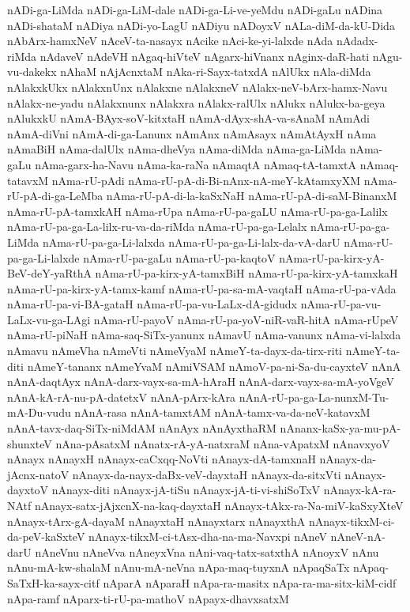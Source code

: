 {nADi-ga-LiMda
nADi-ga-LiM-dale
nADi-ga-Li-ve-yeMdu
nADi-gaLu
nADina
nADi-shataM
nADiya
nADi-yo-LagU
nADiyu
nADoyxV
nALa-diM-da-kU-Dida
nAbArx-hamxNeV
nAceV-ta-nasayx
nAcike
nAci-ke-yi-lalxde
nAda
nAdadx-riMda
nAdaveV
nAdeVH
nAgaq-hiVteV
nAgarx-hiVnanx
nAginx-daR-hati
nAgu-vu-dakekx
nAhaM
nAjAcnxtaM
nAka-ri-Sayx-tatxdA
nAlUkx
nAla-diMda
nAlakxkUkx
nAlakxnUnx
nAlakxne
nAlakxneV
nAlakx-neV-bArx-hamx-Navu
nAlakx-ne-yadu
nAlakxnunx
nAlakxra
nAlakx-ralUlx
nAlukx
nAlukx-ba-geya
nAlukxkU
nAmA-BAyx-soV-kitxtaH
nAmA-dAyx-shA-va-sAnaM
nAmAdi
nAmA-diVni
nAmA-di-ga-Lanunx
nAmAnx
nAmAsayx
nAmAtAyxH
nAma
nAmaBiH
nAma-dalUlx
nAma-dheVya
nAma-diMda
nAma-ga-LiMda
nAma-gaLu
nAma-garx-ha-Navu
nAma-ka-raNa
nAmaqtA
nAmaq-tA-tamxtA
nAmaq-tatavxM
nAma-rU-pAdi
nAma-rU-pA-di-Bi-nAnx-nA-meY-kAtamxyXM
nAma-rU-pA-di-ga-LeMba
nAma-rU-pA-di-la-kaSxNaH
nAma-rU-pA-di-saM-BinanxM
nAma-rU-pA-tamxkAH
nAma-rUpa
nAma-rU-pa-gaLU
nAma-rU-pa-ga-Lalilx
nAma-rU-pa-ga-La-lilx-ru-va-da-riMda
nAma-rU-pa-ga-Lelalx
nAma-rU-pa-ga-LiMda
nAma-rU-pa-ga-Li-lalxda
nAma-rU-pa-ga-Li-lalx-da-vA-darU
nAma-rU-pa-ga-Li-lalxde
nAma-rU-pa-gaLu
nAma-rU-pa-kaqtoV
nAma-rU-pa-kirx-yA-BeV-deY-yaRthA
nAma-rU-pa-kirx-yA-tamxBiH
nAma-rU-pa-kirx-yA-tamxkaH
nAma-rU-pa-kirx-yA-tamx-kamf
nAma-rU-pa-sa-mA-vaqtaH
nAma-rU-pa-vAda
nAma-rU-pa-vi-BA-gataH
nAma-rU-pa-vu-LaLx-dA-gidudx
nAma-rU-pa-vu-LaLx-vu-ga-LAgi
nAma-rU-payoV
nAma-rU-pa-yoV-niR-vaR-hitA
nAma-rUpeV
nAma-rU-piNaH
nAma-saq-SiTx-yanunx
nAmavU
nAma-vanunx
nAma-vi-lalxda
nAmavu
nAmeVha
nAmeVti
nAmeVyaM
nAmeY-ta-dayx-da-tirx-riti
nAmeY-ta-diti
nAmeY-tananx
nAmeYvaM
nAmiVSAM
nAmoV-pa-ni-Sa-du-cayxteV
nAnA
nAnA-daqtAyx
nAnA-darx-vayx-sa-mA-hAraH
nAnA-darx-vayx-sa-mA-yoVgeV
nAnA-kA-rA-nu-pA-datetxV
nAnA-pArx-kAra
nAnA-rU-pa-ga-La-nunxM-Tu-mA-Du-vudu
nAnA-rasa
nAnA-tamxtAM
nAnA-tamx-va-da-neV-katavxM
nAnA-tavx-daq-SiTx-niMdAM
nAnAyx
nAnAyxthaRM
nAnanx-kaSx-ya-mu-pA-shunxteV
nAna-pAsatxM
nAnatx-rA-yA-natxraM
nAna-vApatxM
nAnavxyoV
nAnayx
nAnayxH
nAnayx-caCxqq-NoVti
nAnayx-dA-tamxnaH
nAnayx-da-jAcnx-natoV
nAnayx-da-nayx-daBx-veV-dayxtaH
nAnayx-da-sitxVti
nAnayx-dayxtoV
nAnayx-diti
nAnayx-jA-tiSu
nAnayx-jA-ti-vi-shiSoTxV
nAnayx-kA-ra-NAtf
nAnayx-satx-jAjxcnX-na-kaq-dayxtaH
nAnayx-tAkx-ra-Na-miV-kaSxyXteV
nAnayx-tArx-gA-dayaM
nAnayxtaH
nAnayxtarx
nAnayxthA
nAnayx-tikxM-ci-da-peV-kaSxteV
nAnayx-tikxM-ci-tAsx-dha-na-ma-Navxpi
nAneV
nAneV-nA-darU
nAneVnu
nAneVva
nAneyxVna
nAni-vaq-tatx-satxthA
nAnoyxV
nAnu
nAnu-mA-kw-shalaM
nAnu-mA-neVna
nApa-maq-tuyxnA
nApaqSaTx
nApaq-SaTxH-ka-sayx-citf
nAparA
nAparaH
nApa-ra-masitx
nApa-ra-ma-sitx-kiM-cidf
nApa-ramf
nAparx-ti-rU-pa-mathoV
nApayx-dhavxsatxM
}
